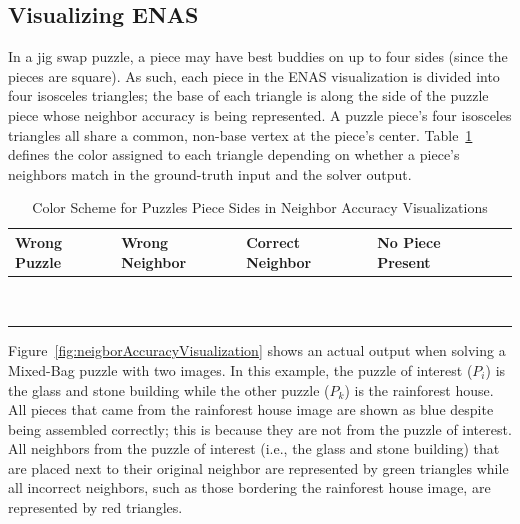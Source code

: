 \subsection{Visualizing ENAS}\label{sec:visualizingNeighborAccuracy}

In a jig swap puzzle, a piece may have best buddies on up to four sides (since the pieces are square).  As such, each piece in the ENAS visualization is divided into four isosceles triangles; the base of each triangle is along the side of the puzzle piece whose neighbor accuracy is being represented.  A puzzle piece's four isosceles triangles all share a common, non-base vertex at the piece's center.  Table~\ref{tab:neighborAccuracyColors} defines the color assigned to each triangle depending on whether a piece's neighbors match in the ground-truth input and the solver output.  

\begin{table}[t]
\begin{center}
  \begin{tabular}{ | >{\centering\arraybackslash}m{0.9in} | >{\centering\arraybackslash}m{0.9in} | >{\centering\arraybackslash}m{0.9in} | >{\centering\arraybackslash}m{0.9in} | >{\centering\arraybackslash}m{0.9in} | }
 \hline
    Wrong Puzzle & Wrong Neighbor & Correct Neighbor  & No Piece Present  \\ \hline
	{\cellcolor{blue}~} & {\cellcolor{red}~} & {\cellcolor{green}~} & {\cellcolor{black}~}  \\
	{\cellcolor{blue}~} & {\cellcolor{red}~} & {\cellcolor{green}~} & {\cellcolor{black}~}  \\
 \hline
  \end{tabular}
\end{center}
\caption{Color Scheme for Puzzles Piece Sides in Neighbor Accuracy Visualizations}\label{tab:neighborAccuracyColors}
\end{table}

Figure~\ref{fig:neigborAccuracyVisualization} shows an actual output when solving a Mixed-Bag puzzle with two images.  In this example, the puzzle of interest ($P_i$) is the glass and stone building while the other puzzle ($P_k$) is the rainforest house.  All pieces that came from the rainforest house image are shown as blue despite being assembled correctly; this is because they are not from the puzzle of interest.  All neighbors from the puzzle of interest (i.e., the glass and stone building) that are placed next to their original neighbor are represented by green triangles while all incorrect neighbors, such as those bordering the rainforest house image, are represented by red triangles.

